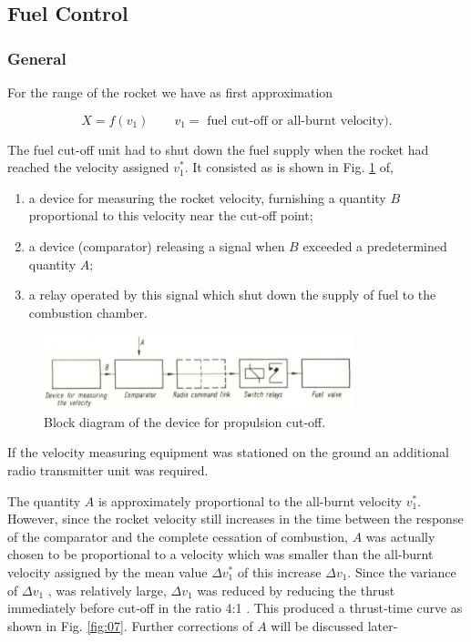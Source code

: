 \documentclass[12pt, a4paper]{article}
\begin{document}
\subsection{Fuel Control}

\subsubsection{General}

For the range of the rocket we have as first approximation

\begin{equation}
  X=f(v_{1})\quad\quad v_{1}=\text{ fuel cut-off or all-burnt velocity).}
\end{equation}

The fuel cut-off unit had to shut down the fuel supply when the rocket had reached the velocity assigned $v_{1}^{*}$. It consisted as is shown in Fig. \ref{fig:06} of,

\begin{enumerate}
  \item a device for measuring the rocket velocity, furnishing a quantity $B$ proportional to this velocity near the cut-off point;
  \item a device (comparator) releasing a signal when $B$ exceeded a predetermined
quantity $A$;
  \item a relay operated by this signal which shut down the supply of fuel to the
combustion chamber.
\end{enumerate}

\begin{figure}[ht]
  \centering
  \includegraphics[width=0.8\textwidth]{figs/ctrl-06.png}
  \caption{Block diagram of the device for propulsion cut-off.}
  \label{fig:06}
\end{figure}

If the velocity measuring equipment was stationed on the ground an additional radio transmitter unit was required.

The quantity $A$ is approximately proportional to the all-burnt velocity $v_{1}^{*}$. However, since the rocket velocity still increases in the time between the response of the comparator and the complete cessation of combustion, $A$ was actually chosen to be proportional to a velocity which was smaller than the all-burnt velocity assigned by the mean value $\Delta v_{1}^{*}$ of this increase $\Delta v_{1} $. Since the variance of $\Delta v_{1}$ , was relatively large, $\Delta v_{1}$  was reduced by reducing the thrust immediately before cut-off in the ratio 4:1 . This produced a thrust-time curve as shown in Fig. \ref{fig:07}. Further corrections of $A$ will be discussed later-
\end{document}
